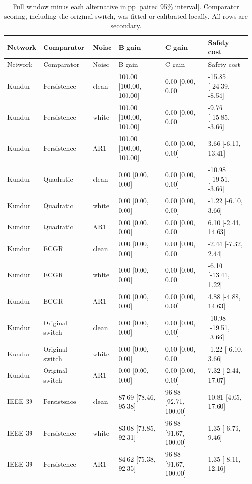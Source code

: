 \documentclass[10pt]{article}
\begin{document}
\begin{longtable}{@{}llllll@{}}
\caption{Full window minus each alternative in pp [paired 95\% interval]. Comparator scoring, including the original switch, was fitted or calibrated locally. All rows are secondary.}\label{tab:methods}\\
\toprule Network & Comparator & Noise & B gain & C gain & Safety cost \\\midrule\endfirsthead
\toprule Network & Comparator & Noise & B gain & C gain & Safety cost \\\midrule\endhead
Kundur & Persistence & clean & 100.00 [100.00, 100.00] & 0.00 [0.00, 0.00] & -15.85 [-24.39, -8.54] \\
Kundur & Persistence & white & 100.00 [100.00, 100.00] & 0.00 [0.00, 0.00] & -9.76 [-15.85, -3.66] \\
Kundur & Persistence & AR1 & 100.00 [100.00, 100.00] & 0.00 [0.00, 0.00] & 3.66 [-6.10, 13.41] \\
Kundur & Quadratic & clean & 0.00 [0.00, 0.00] & 0.00 [0.00, 0.00] & -10.98 [-19.51, -3.66] \\
Kundur & Quadratic & white & 0.00 [0.00, 0.00] & 0.00 [0.00, 0.00] & -1.22 [-6.10, 3.66] \\
Kundur & Quadratic & AR1 & 0.00 [0.00, 0.00] & 0.00 [0.00, 0.00] & 6.10 [-2.44, 14.63] \\
Kundur & ECGR & clean & 0.00 [0.00, 0.00] & 0.00 [0.00, 0.00] & -2.44 [-7.32, 2.44] \\
Kundur & ECGR & white & 0.00 [0.00, 0.00] & 0.00 [0.00, 0.00] & -6.10 [-13.41, 1.22] \\
Kundur & ECGR & AR1 & 0.00 [0.00, 0.00] & 0.00 [0.00, 0.00] & 4.88 [-4.88, 14.63] \\
Kundur & Original switch & clean & 0.00 [0.00, 0.00] & 0.00 [0.00, 0.00] & -10.98 [-19.51, -3.66] \\
Kundur & Original switch & white & 0.00 [0.00, 0.00] & 0.00 [0.00, 0.00] & -1.22 [-6.10, 3.66] \\
Kundur & Original switch & AR1 & 0.00 [0.00, 0.00] & 0.00 [0.00, 0.00] & 7.32 [-2.44, 17.07] \\
IEEE 39 & Persistence & clean & 87.69 [78.46, 95.38] & 96.88 [92.71, 100.00] & 10.81 [4.05, 17.60] \\
IEEE 39 & Persistence & white & 83.08 [73.85, 92.31] & 96.88 [91.67, 100.00] & 1.35 [-6.76, 9.46] \\
IEEE 39 & Persistence & AR1 & 84.62 [75.38, 92.35] & 96.88 [91.67, 100.00] & 1.35 [-8.11, 12.16] \\

\end{longtable}
\end{document}

